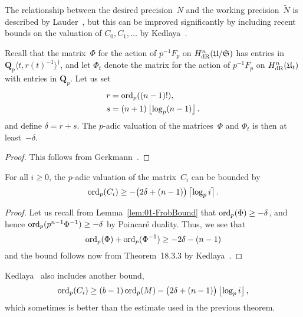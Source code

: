 The relationship between the desired precision~$N$ and the working 
precision~$\tilde{N}$ is described by Lauder~\citep[Theorem~5.1]{Lauder2006}, 
but this can be improved significantly by including recent bounds on the 
valuation of $C_0, C_1, \dotsc$ by Kedlaya~\citep{Kedlaya2010}.

\begin{lem} \label{lem:01-FrobBound}
Recall that the matrix~$\Phi$ for the action of $p^{-1} F_p$ 
on $H_{\text{dR}}^{n}(\mathfrak{U}/\mathfrak{S})$ has entries in 
$\mathbf{Q}_p\langle t, r(t)^{-1}\rangle^{\dagger}$, 
and let $\Phi_t$ denote the matrix for the action of $p^{-1} F_p$ 
on $H_{\text{dR}}^{n}(\mathfrak{U}_t)$ with entries in $\mathbf{Q}_p$.
Let us set 
\begin{align*}
r & = \operatorname{ord}_p((n-1)!), \\
s & = (n + 1) \left\lfloor\log_p(n-1)\right\rfloor.
\end{align*}
and define  $\delta = r + s$.  The $p$-adic valuation of the 
matrices~$\Phi$ and $\Phi_t$ is then at least~$-\delta$.
\end{lem}

\begin{proof}
This follows from Gerkmann~\citep[Lemma~3.3]{Gerkmann2007}.
\end{proof}

\begin{thm} \label{thm:valC}
For all $i \geq 0$, the $p$-adic valuation of the matrix~$C_i$ 
can be bounded by 
\begin{equation*}
\operatorname{ord}_p(C_i) \geq - \bigl(2 \delta + (n - 1)\bigr) \left\lceil\log_p i\right\rceil.
\end{equation*}
\end{thm}

\begin{proof}
Let us recall from Lemma~\ref{lem:01-FrobBound} that 
$\operatorname{ord}_p(\Phi) \geq -\delta$, and hence $\operatorname{ord}_p(p^{n-1}\Phi^{-1}) \geq -\delta$ 
by Poincar\'e duality.  Thus, we see that 
\begin{equation*}
\operatorname{ord}_p(\Phi) + \operatorname{ord}_p(\Phi^{-1}) \geq - 2 \delta - (n-1)
\end{equation*}
and the bound follows now from Theorem~{18.3.3} by 
Kedlaya~\citep{Kedlaya2010}.
\end{proof}

\begin{rem}
Kedlaya~\citep[Remark~18.3.4]{Kedlaya2010} also includes another bound,
\begin{equation*}
\operatorname{ord}_p(C_i) \geq (b - 1) \operatorname{ord}_p(M) 
            - \bigl(2 \delta + (n - 1)\bigr) \left\lfloor\log_p i\right\rfloor,
\end{equation*}
which sometimes is better than the estimate used in the previous 
theorem.
\end{rem}

